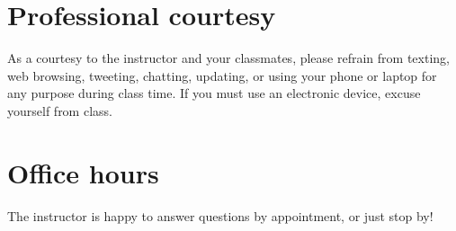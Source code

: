 \documentclass[11pt]{article}
\begin{document}
\section{Professional courtesy}
\label{sec:org619a5b8}
As a courtesy to the instructor and your classmates, please refrain from
texting, web browsing, tweeting, chatting, updating, or using your phone or laptop for any
purpose during class time.  If you must use an electronic device, excuse
yourself from class.

\section{Office hours}
\label{sec:org65451c7}
The instructor is happy to answer questions by appointment, or just stop by!
\end{document}
